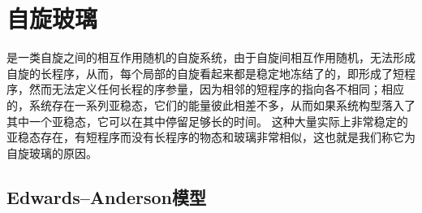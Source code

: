 \chapter{自旋玻璃}

是一类自旋之间的相互作用随机的自旋系统，由于自旋间相互作用随机，无法形成自旋的长程序，从而，每个局部的自旋看起来都是稳定地冻结了的，即形成了短程序，然而无法定义任何长程的序参量，因为相邻的短程序的指向各不相同；相应的，系统存在一系列亚稳态，它们的能量彼此相差不多，从而如果系统构型落入了其中一个亚稳态，它可以在其中停留足够长的时间。
这种大量实际上非常稳定的亚稳态存在，有短程序而没有长程序的物态和玻璃非常相似，这也就是我们称它为自旋玻璃的原因。

\section{Edwards–Anderson模型}


